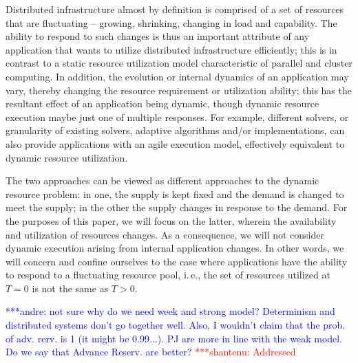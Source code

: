 \documentclass[conference,final]{IEEEtran}
\newcommand{\jhanote}[1]{ {\textcolor{red} { ***shantenu: #1 }}}
\newcommand{\alnote}[1]{ {\textcolor{blue} { ***andre: #1 }}}
\newcommand{\alnote}[1]{}
\newcommand{\jhanote}[1]{}
\begin{document}
Distributed infrastructure almost by definition is comprised of a set
of resources that are fluctuating -- growing, shrinking, changing in
load and capability.  The ability to respond to such changes is thus
an important attribute of any application that wants to utilize
distributed infrastructure efficiently; this is in contrast to a
static resource utilization model characteristic of parallel and
cluster computing.  In addition, the evolution or internal dynamics of
an application may vary, thereby changing the resource requirement or
utilization ability; this has the resultant effect of an application
being dynamic, though dynamic resource execution maybe just one of
multiple responses.  For example, different solvers, or granularity of
existing solvers, adaptive algorithms and/or implementations, can also
provide applications with an agile execution model, effectively
equivalent to dynamic resource utilization.

The two approaches can be viewed as different approaches to the
dynamic resource problem: in one, the supply is kept fixed and the
demand is changed to meet the supply; in the other the supply changes
in response to the demand.  For the purposes of this paper, we will
focus on the latter, wherein the availability and utilization of
resources changes.  As a consequence, we will not consider dynamic
execution arising from internal application changes.
In other words, we will concern and confine ourselves to the case
where applications have the ability to respond to a fluctuating
resource pool, i.\,e., the set of resources utilized at $T=0$ is not
the same as $T>0$.  



\alnote{not sure why do we need week and strong model? Determinism and
  distributed systems don't go together well. Also, I wouldn't claim
  that the prob. of adv. rerv. is 1 (it might be 0.99...). PJ are more
  in line with the weak model. Do we say that Advance Reserv. are
  better?}  \jhanote{Addressed}
\end{document}
